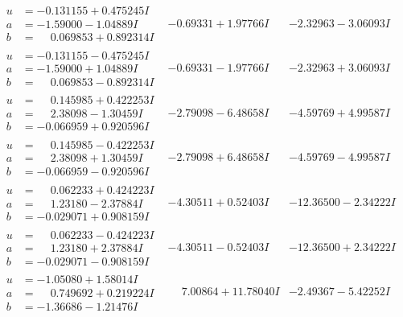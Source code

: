 \documentclass[1p]{elsarticle_modified}
\theoremstyle{definition}
\begin{document}
$$\begin{array}{c|c|c}
\begin{aligned}
u &= -0.131155 + 0.475245 I \\
a &= -1.59000 - 1.04889 I \\
b &= \phantom{-}0.069853 + 0.892314 I\end{aligned}
 & -0.69331 + 1.97766 I & -2.32963 - 3.06093 I \\ \hline\begin{aligned}
u &= -0.131155 - 0.475245 I \\
a &= -1.59000 + 1.04889 I \\
b &= \phantom{-}0.069853 - 0.892314 I\end{aligned}
 & -0.69331 - 1.97766 I & -2.32963 + 3.06093 I \\ \hline\begin{aligned}
u &= \phantom{-}0.145985 + 0.422253 I \\
a &= \phantom{-}2.38098 - 1.30459 I \\
b &= -0.066959 + 0.920596 I\end{aligned}
 & -2.79098 - 6.48658 I & -4.59769 + 4.99587 I \\ \hline\begin{aligned}
u &= \phantom{-}0.145985 - 0.422253 I \\
a &= \phantom{-}2.38098 + 1.30459 I \\
b &= -0.066959 - 0.920596 I\end{aligned}
 & -2.79098 + 6.48658 I & -4.59769 - 4.99587 I \\ \hline\begin{aligned}
u &= \phantom{-}0.062233 + 0.424223 I \\
a &= \phantom{-}1.23180 - 2.37884 I \\
b &= -0.029071 + 0.908159 I\end{aligned}
 & -4.30511 + 0.52403 I & -12.36500 - 2.34222 I \\ \hline\begin{aligned}
u &= \phantom{-}0.062233 - 0.424223 I \\
a &= \phantom{-}1.23180 + 2.37884 I \\
b &= -0.029071 - 0.908159 I\end{aligned}
 & -4.30511 - 0.52403 I & -12.36500 + 2.34222 I \\ \hline\begin{aligned}
u &= -1.05080 + 1.58014 I \\
a &= \phantom{-}0.749692 + 0.219224 I \\
b &= -1.36686 - 1.21476 I\end{aligned}
 & \phantom{-}7.00864 + 11.78040 I & -2.49367 - 5.42252 I \\ \hline\begin{aligned}

\end{aligned}
\end{array}$$
\end{document}
